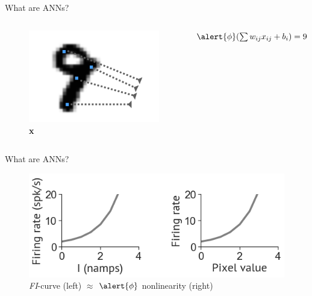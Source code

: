 \documentclass[10pt]{beamer}
\begin{document}
\begin{frame}[fragile]{What are ANNs?}
\begin{columns}
\begin{figure}
    \centering
    \includegraphics[scale=0.5]{images/nine_x.png} 
    \caption{\textbf{x}}
\end{figure}
\centering
 $\alert{\phi}(\sum w_{ij} x_{ij} + b_i) = 9$
\end{columns}
\end{frame}

\begin{frame}[fragile]{What are ANNs?}
\begin{figure}
    \centering
    \includegraphics[scale=0.4]{images/phi.png}
    \caption{\textit{FI}-curve (left) $\approx$ $\alert{\phi}$ nonlinearity (right)}
\end{figure}
\end{frame}
\end{document}
